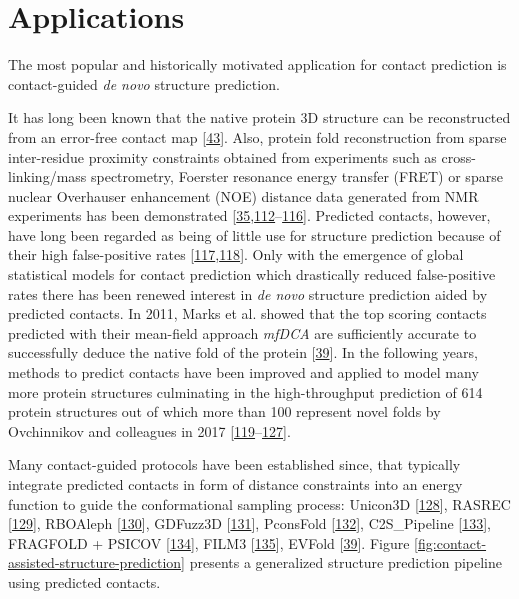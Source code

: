 \documentclass[11pt,a4paper,twoside]{book}
\theoremstyle{definition}
\theoremstyle{definition}
\theoremstyle{remark}
\begin{document}
\section{Applications}\label{application-contact-prediction}

The most popular and historically motivated application for contact
prediction is contact-guided \emph{de novo} structure prediction.

It has long been known that the native protein 3D structure can be
reconstructed from an error-free contact map
{[}\protect\hyperlink{ref-Vendruscolo1997}{43}{]}. Also, protein fold
reconstruction from sparse inter-residue proximity constraints obtained
from experiments such as cross-linking/mass spectrometry, Foerster
resonance energy transfer (FRET) or sparse nuclear Overhauser
enhancement (NOE) distance data generated from NMR experiments has been
demonstrated
{[}\protect\hyperlink{ref-Li2004}{35},\protect\hyperlink{ref-Yu2013}{112}--\protect\hyperlink{ref-Aszodi1995a}{116}{]}.
Predicted contacts, however, have long been regarded as being of little
use for structure prediction because of their high false-positive rates
{[}\protect\hyperlink{ref-Wu2011}{117},\protect\hyperlink{ref-Tress2010}{118}{]}.
Only with the emergence of global statistical models for contact
prediction which drastically reduced false-positive rates there has been
renewed interest in \emph{de novo} structure prediction aided by
predicted contacts. In 2011, Marks et al. showed that the top scoring
contacts predicted with their mean-field approach \emph{mfDCA} are
sufficiently accurate to successfully deduce the native fold of the
protein {[}\protect\hyperlink{ref-Marks2011}{39}{]}. In the following
years, methods to predict contacts have been improved and applied to
model many more protein structures culminating in the high-throughput
prediction of 614 protein structures out of which more than 100
represent novel folds by Ovchinnikov and colleagues in 2017
{[}\protect\hyperlink{ref-Hopf2012}{119}--\protect\hyperlink{ref-Ovchinnikov2017}{127}{]}.

Many contact-guided protocols have been established since, that
typically integrate predicted contacts in form of distance constraints
into an energy function to guide the conformational sampling process:
Unicon3D {[}\protect\hyperlink{ref-Bhattacharya2016}{128}{]}, RASREC
{[}\protect\hyperlink{ref-Braun2015}{129}{]}, RBOAleph
{[}\protect\hyperlink{ref-Mabrouk2015a}{130}{]}, GDFuzz3D
{[}\protect\hyperlink{ref-Pietal2015a}{131}{]}, PconsFold
{[}\protect\hyperlink{ref-Michel2014}{132}{]}, C2S\_Pipeline
{[}\protect\hyperlink{ref-Konopka2014}{133}{]}, FRAGFOLD + PSICOV
{[}\protect\hyperlink{ref-Kosciolek2014}{134}{]}, FILM3
{[}\protect\hyperlink{ref-Nugent2012}{135}{]}, EVFold
{[}\protect\hyperlink{ref-Marks2011}{39}{]}. Figure
\ref{fig:contact-assisted-structure-prediction} presents a generalized
structure prediction pipeline using predicted contacts.
\end{document}
